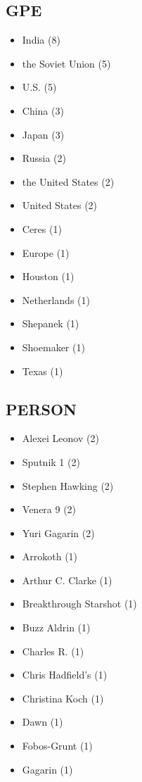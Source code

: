 \documentclass[12pt]{article}
\begin{document}
\subsection*{GPE}
\begin{itemize}
\item India (8)
\item the Soviet Union (5)
\item U.S. (5)
\item China (3)
\item Japan (3)
\item Russia (2)
\item the United States (2)
\item United States (2)
\item Ceres (1)
\item Europe (1)
\item Houston (1)
\item Netherlands (1)
\item Shepanek (1)
\item Shoemaker (1)
\item Texas (1)
\end{itemize}

\subsection*{PERSON}
\begin{itemize}
\item Alexei Leonov (2)
\item Sputnik 1 (2)
\item Stephen Hawking (2)
\item Venera 9 (2)
\item Yuri Gagarin (2)
\item Arrokoth (1)
\item Arthur C. Clarke (1)
\item Breakthrough Starshot (1)
\item Buzz Aldrin (1)
\item Charles R. (1)
\item Chris Hadfield's (1)
\item Christina Koch (1)
\item Dawn (1)
\item Fobos-Grunt (1)
\item Gagarin (1)
\end{itemize}
\end{document}
